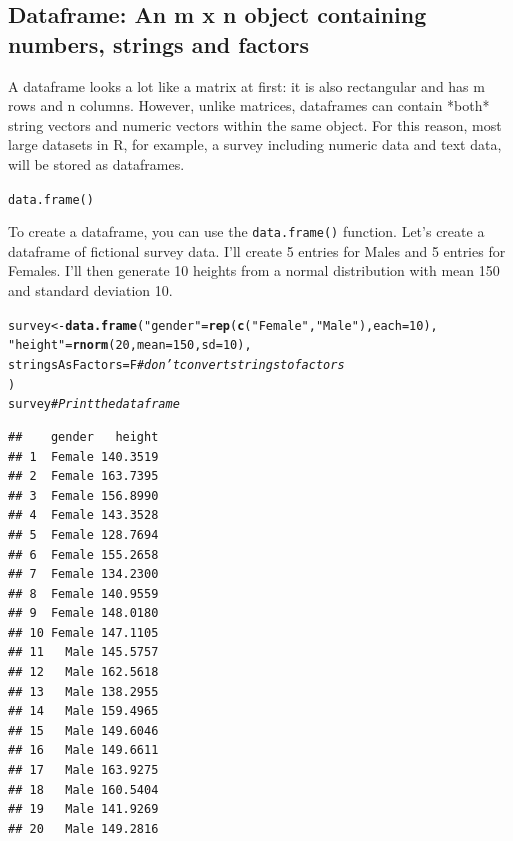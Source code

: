 \documentclass{tufte-book}\usepackage[]{graphicx}\usepackage[]{color}
\makeatletter
\newcommand{\hlnum}[1]{\textcolor[rgb]{0.686,0.059,0.569}{#1}}%
\newcommand{\hlstr}[1]{\textcolor[rgb]{0.192,0.494,0.8}{#1}}%
\newcommand{\hlcom}[1]{\textcolor[rgb]{0.678,0.584,0.686}{\textit{#1}}}%
\newcommand{\hlstd}[1]{\textcolor[rgb]{0.345,0.345,0.345}{#1}}%
\newcommand{\hlkwb}[1]{\textcolor[rgb]{0.69,0.353,0.396}{#1}}%
\newcommand{\hlkwc}[1]{\textcolor[rgb]{0.333,0.667,0.333}{#1}}%
\newcommand{\hlkwd}[1]{\textcolor[rgb]{0.737,0.353,0.396}{\textbf{#1}}}%
\newenvironment{kframe}{%
 \def\at@end@of@kframe{}%
 \ifinner\ifhmode%
  \def\at@end@of@kframe{\end{minipage}}%
  \begin{minipage}{\columnwidth}%
 \fi\fi%
 \def\FrameCommand##1{\hskip\@totalleftmargin \hskip-\fboxsep
 \colorbox{shadecolor}{##1}\hskip-\fboxsep
     \hskip-\linewidth \hskip-\@totalleftmargin \hskip\columnwidth}%
 \MakeFramed {\advance\hsize-\width
   \@totalleftmargin\z@ \linewidth\hsize
   \@setminipage}}%
 {\par\unskip\endMakeFramed%
 \at@end@of@kframe}
\newenvironment{knitrout}{}{} %
\newcommand{\newfun}[1]{\begin{LARGE} \begin{center} \texttt{#1} \end{center} \end{LARGE}}
\makeatother
\begin{document}
\begin{footnotesize}
\subsection{Dataframe: An m x n object containing numbers, strings and factors}

A dataframe looks a lot like a matrix at first: it is also rectangular and has m rows and n columns. However, unlike matrices, dataframes can contain *both* string vectors and numeric vectors within the same object. For this reason, most large datasets in R, for example, a survey including numeric data and text data, will be stored as dataframes.


\newfun{data.frame()}

To create a dataframe, you can use the \texttt{data.frame()} function. Let's create a dataframe of fictional survey data. I'll create 5 entries for Males and 5 entries for Females. I'll then generate 10 heights from a normal distribution with mean 150 and standard deviation 10.

\begin{footnotesize}
\begin{knitrout}
\color{fgcolor}\begin{kframe}
\begin{alltt}
\hlstd{survey} \hlkwb{<-} \hlkwd{data.frame}\hlstd{(}\hlstr{"gender"} \hlstd{=} \hlkwd{rep}\hlstd{(}\hlkwd{c}\hlstd{(}\hlstr{"Female"}\hlstd{,} \hlstr{"Male"}\hlstd{),} \hlkwc{each} \hlstd{=} \hlnum{10}\hlstd{),}
                     \hlstr{"height"} \hlstd{=} \hlkwd{rnorm}\hlstd{(}\hlnum{20}\hlstd{,} \hlkwc{mean} \hlstd{=} \hlnum{150}\hlstd{,} \hlkwc{sd} \hlstd{=} \hlnum{10}\hlstd{),}
                     \hlkwc{stringsAsFactors} \hlstd{= F} \hlcom{# don't convert strings to factors}
                    \hlstd{)}
\hlstd{survey} \hlcom{# Print the dataframe}
\end{alltt}
\begin{verbatim}
##    gender   height
## 1  Female 140.3519
## 2  Female 163.7395
## 3  Female 156.8990
## 4  Female 143.3528
## 5  Female 128.7694
## 6  Female 155.2658
## 7  Female 134.2300
## 8  Female 140.9559
## 9  Female 148.0180
## 10 Female 147.1105
## 11   Male 145.5757
## 12   Male 162.5618
## 13   Male 138.2955
## 14   Male 159.4965
## 15   Male 149.6046
## 16   Male 149.6611
## 17   Male 163.9275
## 18   Male 160.5404
## 19   Male 141.9269
## 20   Male 149.2816
\end{verbatim}
\end{kframe}
\end{knitrout}
\end{footnotesize}


\end{footnotesize}
\end{document}
